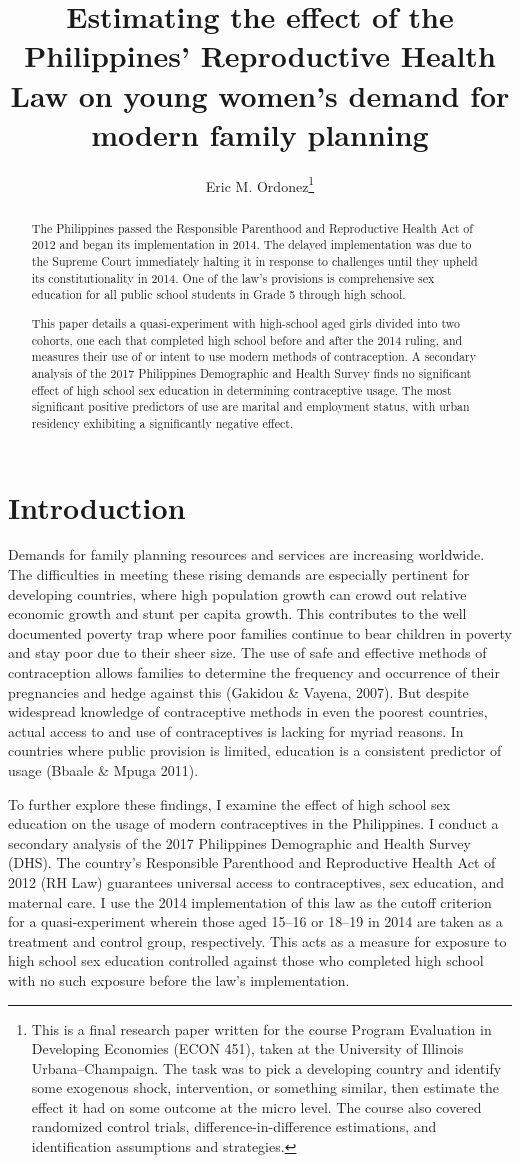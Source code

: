 \documentclass[12pt]{article}
\title{Estimating the effect of the Philippines' Reproductive Health Law on young women's demand for modern family planning}
\author{Eric M. Ordonez\thanks{
    This is a final research paper written for the course Program Evaluation in Developing Economies (ECON 451), taken at the University of Illinois Urbana--Champaign.
    The task was to pick a developing country and identify some exogenous shock, intervention, or something similar, then estimate the effect it had on some outcome at the micro level.
    The course also covered randomized control trials, difference-in-difference estimations, and identification assumptions and strategies.
}}
\date{}
\begin{document}
\maketitle
\begin{abstract}
    The Philippines passed the Responsible Parenthood and Reproductive Health Act of 2012 and began its implementation in 2014.
    The delayed implementation was due to the Supreme Court immediately halting it in response to challenges until they upheld its constitutionality in 2014.
    One of the law's provisions is comprehensive sex education for all public school students in Grade 5 through high school.
    
    This paper details a quasi-experiment with high-school aged girls divided into two cohorts, one each that completed high school before and after the 2014 ruling, and measures their use of or intent to use modern methods of contraception.
    A secondary analysis of the 2017 Philippines Demographic and Health Survey finds no significant effect of high school sex education in determining contraceptive usage.
    The most significant positive predictors of use are marital and employment status, with urban residency exhibiting a significantly negative effect.
\end{abstract}
\pagebreak
\tableofcontents


\pagebreak
\section{Introduction}
Demands for family planning resources and services are increasing worldwide.
The difficulties in meeting these rising demands are especially pertinent for developing countries, where high population growth can crowd out relative economic growth and stunt per capita growth.
This contributes to the well documented poverty trap where poor families continue to bear children in poverty and stay poor due to their sheer size.
The use of safe and effective methods of contraception allows families to determine the frequency and occurrence of their pregnancies and hedge against this (Gakidou \& Vayena, 2007).
But despite widespread knowledge of contraceptive methods in even the poorest countries, actual access to and use of contraceptives is lacking for myriad reasons.
In countries where public provision is limited, education is a consistent predictor of usage (Bbaale \& Mpuga 2011).

To further explore these findings, I examine the effect of high school sex education on the usage of modern contraceptives in the Philippines.
I conduct a secondary analysis of the 2017 Philippines Demographic and Health Survey (DHS).
The country's Responsible Parenthood and Reproductive Health Act of 2012 (RH Law) guarantees universal access to contraceptives, sex education, and maternal care.
I use the 2014 implementation of this law as the cutoff criterion for a quasi-experiment wherein those aged 15--16 or 18--19 in 2014 are taken as a treatment and control group, respectively.
This acts as a measure for exposure to high school sex education controlled against those who completed high school with no such exposure before the law's implementation.
\end{document}
